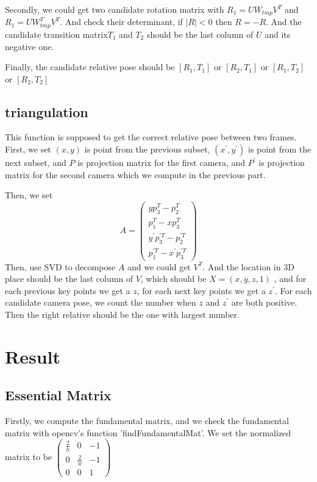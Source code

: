 \documentclass{article}
\begin{document}
	Secondly, we could get two candidate rotation matrix with $R_1 = UW_{tmp}V^T$ and $R_1 = UW_{tmp}^{T}V^T$. And check their determinant, if $|R| < 0$ then $R = -R$. And the candidate transition matrix$T_1$ and $T_2$ should be the last column of $U$ and its negative one. 
	
	Finally, the candidate relative pose should be $[R_1, T_1]$ or $[R_2, T_1]$ or $[R_1, T_2]$ or $[R_2, T_2]$
	\subsection{triangulation}
	This function is supposed to get the correct relative pose between two frames. First, we set $(x,y)$ is point from the previous subset, $(x^{'},y^{'})$ is point from the next subset, and $P$ is projection matrix for the first camera, and $P^{'}$ is projection matrix for the second camera which we compute in the previous part. 
	
	Then, we set $$A = \begin{pmatrix}
	yp_{3}^{T} - p_{2}^{T} \\
	p_{1}^{T} - xp_{3}^{T} \\
	y^{'}p_{3}^{'T} - p_{2}^{'T} \\
	p_{1}^{'T} - x^{'}p_{3}^{'T}
	\end{pmatrix}$$
	Then, use SVD to decompose $A$ and we could get $V^{T}$. And the location in 3D place should be the last column of $V$, which should be $X = (x,y,z,1)$ , and for each previous key points we get a $z$, for each next key points we get a $z^{'}$. For each candidate camera pose, we count the number when $z$ and $z^{'}$ are both positive.  Then the right relative should be the one with largest number. 
	

\section{Result}

\subsection{Essential Matrix}
Firstly, we compute the fundamental matrix, and we check the fundamental matrix with opencv's function 'findFundamentalMat'. We set the normalized matrix to be $\begin{pmatrix}
\frac{2}{h} & 0 & -1 \\
0 & \frac{2}{w} & -1 \\
0 & 0 & 1
\end{pmatrix}$
\end{document}
